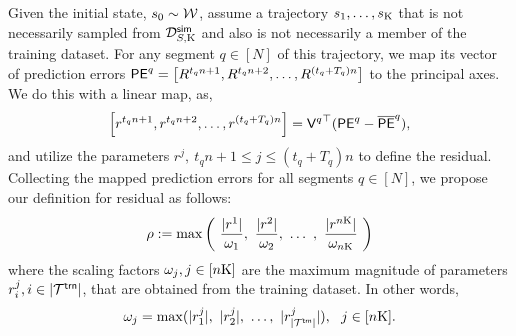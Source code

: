 Given the initial state, $s_0 \sim \mathcal{W}$, assume a trajectory $s_1, \ldots, s_{\mathrm{K}}$ that is not necessarily sampled from $\mathcal{D}_{S,\mathrm{K}}^{\mathsf{sim}}$ and also is not necessarily a member of the training dataset. For any segment $q \in [N]$ of this trajectory, we map its vector of prediction errors $\mathsf{PE}^q = \left[ R^{t_q n+1}, R^{t_q n+2}, \ldots, R^{(t_q+T_q)n} \right]$ to the principal axes. We do this with a linear map, as, 
\begin{equation}\label{eq:PCAerror}
\left[ r^{t_q n+1},r^{t_q n+2}, \ldots, r^{(t_q+T_q)n} \right] = {\mathsf{V}^{ q}}^{\top} (\mathsf{PE}^q - \overline{\mathsf{PE}}^{q}),
\end{equation} 
and utilize the parameters $r^j,\ t_q n+1\leq j \leq (t_q+T_q)n$ to define the residual. Collecting the mapped prediction errors for all segments $q\in[N]$, we propose our definition for residual as follows:
\begin{equation}\label{eq:PCAres}
    \rho:=  \max \left(\  \frac{|r^1|}{\omega_1} ,\  \frac{|r^2|}{\omega_2} ,\  \ldots \ , \  \frac{|r^{n\mathrm{K}}|}{\omega_{n\mathrm{K}}}\ \right)
\end{equation}
where the scaling factors $\omega_j , j \in [n\mathrm{K}]$ are the maximum magnitude of parameters $r^j_i , i\in |\mathcal{T}^{\mathsf{trn}}|$, that are obtained from the training dataset. In other words,
\begin{equation}
\omega_j = \max( |r^{j}_1|,\  |r^{j}_2|,\  \ldots,\  |r^{j}_{|\mathcal{T}^{\mathsf{trn}}|}|  ),\ \  j \in[n\mathrm{K}]. 
\end{equation}

